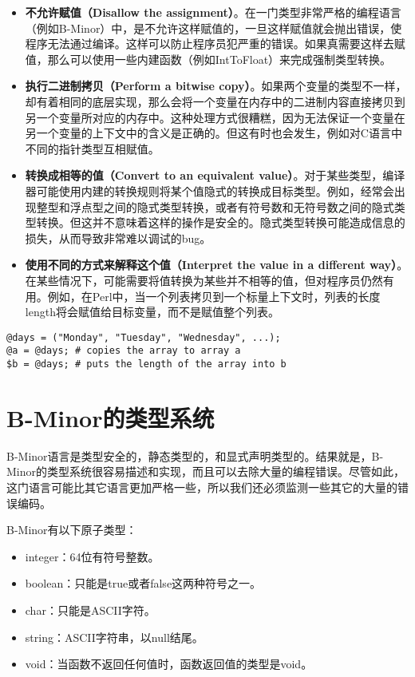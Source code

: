 \documentclass[cn,11pt,chinese]{elegantbook}
\begin{document}
\begin{itemize}
  \item \textbf{不允许赋值（Disallow the assignment）}。在一门类型非常严格的编程语言（例如B-Minor）中，是不允许这样赋值的，一旦这样赋值就会抛出错误，使程序无法通过编译。这样可以防止程序员犯严重的错误。如果真需要这样去赋值，那么可以使用一些内建函数（例如IntToFloat）来完成强制类型转换。
  \item \textbf{执行二进制拷贝（Perform a bitwise copy）}。如果两个变量的类型不一样，却有着相同的底层实现，那么会将一个变量在内存中的二进制内容直接拷贝到另一个变量所对应的内存中。这种处理方式很糟糕，因为无法保证一个变量在另一个变量的上下文中的含义是正确的。但这有时也会发生，例如对C语言中不同的指针类型互相赋值。
  \item \textbf{转换成相等的值（Convert to an equivalent value）}。对于某些类型，编译器可能使用内建的转换规则将某个值隐式的转换成目标类型。例如，经常会出现整型和浮点型之间的隐式类型转换，或者有符号数和无符号数之间的隐式类型转换。但这并不意味着这样的操作是安全的。隐式类型转换可能造成信息的损失，从而导致非常难以调试的bug。
  \item \textbf{使用不同的方式来解释这个值（Interpret the value in a different way）}。在某些情况下，可能需要将值转换为某些并不相等的值，但对程序员仍然有用。例如，在Perl中，当一个列表拷贝到一个标量上下文时，列表的长度length将会赋值给目标变量，而不是赋值整个列表。
\end{itemize}

\begin{verbatim}
@days = ("Monday", "Tuesday", "Wednesday", ...);
@a = @days; # copies the array to array a
$b = @days; # puts the length of the array into b
\end{verbatim}

\section{B-Minor的类型系统}

B-Minor语言是类型安全的，静态类型的，和显式声明类型的。结果就是，B-Minor的类型系统很容易描述和实现，而且可以去除大量的编程错误。尽管如此，这门语言可能比其它语言更加严格一些，所以我们还必须监测一些其它的大量的错误编码。

B-Minor有以下原子类型：

\begin{itemize}
  \item integer：64位有符号整数。
  \item boolean：只能是true或者false这两种符号之一。
  \item char：只能是ASCII字符。
  \item string：ASCII字符串，以null结尾。
  \item void：当函数不返回任何值时，函数返回值的类型是void。
\end{itemize}
\end{document}
